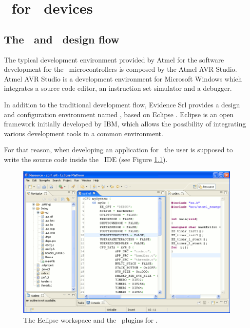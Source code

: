 \chapter[\ee\ for \avr devices]{\ee\ for \avr\ devices}
\label{cha:singlecpu}

\section{The \rtd\ and \ee\ design flow}


The typical development environment provided by Atmel for the software
development for the \avr\ microcontrollers is composed by the Atmel
AVR Studio. Atmel AVR Studio is a development environment for
Microsoft Windows which integrates a source code editor, an
instruction set simulator and a debugger.

In addition to the traditional development flow, Evidence Srl provides
a design and configuration environment named \rtd, based on Eclipse
\cite{Eclipse}. Eclipse is an open framework initially developed by
IBM, which allows the possibility of integrating various development
tools in a common environment.

For that reason, when developing an application for \ee\, the
user is supposed to write the source code inside the \rtd\ IDE (see
Figure \ref{fig:eclipse_avr5_workspace}).

\begin{figure}
  \begin{center}
    \includegraphics[width=12cm, bb=0 0 866 594]{images/eclipse_avr5_workspace.png}
  \end{center}
  \caption{The Eclipse workspace and the \rtd\ plugins for \avr.}
  \label{fig:eclipse_avr5_workspace}
\end{figure}

